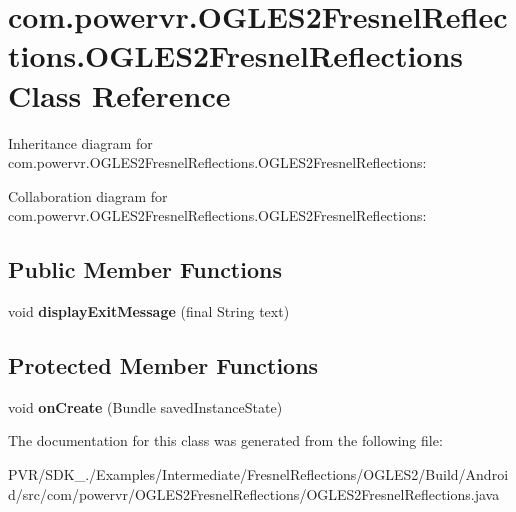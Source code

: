 \hypertarget{classcom_1_1powervr_1_1_o_g_l_e_s2_fresnel_reflections_1_1_o_g_l_e_s2_fresnel_reflections}{\section{com.\+powervr.\+O\+G\+L\+E\+S2\+Fresnel\+Reflections.\+O\+G\+L\+E\+S2\+Fresnel\+Reflections Class Reference}
\label{classcom_1_1powervr_1_1_o_g_l_e_s2_fresnel_reflections_1_1_o_g_l_e_s2_fresnel_reflections}
}


Inheritance diagram for com.\+powervr.\+O\+G\+L\+E\+S2\+Fresnel\+Reflections.\+O\+G\+L\+E\+S2\+Fresnel\+Reflections\+:


Collaboration diagram for com.\+powervr.\+O\+G\+L\+E\+S2\+Fresnel\+Reflections.\+O\+G\+L\+E\+S2\+Fresnel\+Reflections\+:
\subsection*{Public Member Functions}
\begin{DoxyCompactItemize}
\item 
\hypertarget{classcom_1_1powervr_1_1_o_g_l_e_s2_fresnel_reflections_1_1_o_g_l_e_s2_fresnel_reflections_a46b8befbe002f8732591d287bd32f2f6}{void {\bfseries display\+Exit\+Message} (final String text)}\label{classcom_1_1powervr_1_1_o_g_l_e_s2_fresnel_reflections_1_1_o_g_l_e_s2_fresnel_reflections_a46b8befbe002f8732591d287bd32f2f6}

\end{DoxyCompactItemize}
\subsection*{Protected Member Functions}
\begin{DoxyCompactItemize}
\item 
\hypertarget{classcom_1_1powervr_1_1_o_g_l_e_s2_fresnel_reflections_1_1_o_g_l_e_s2_fresnel_reflections_a22d1727378de362b382200a2e274b8fb}{void {\bfseries on\+Create} (Bundle saved\+Instance\+State)}\label{classcom_1_1powervr_1_1_o_g_l_e_s2_fresnel_reflections_1_1_o_g_l_e_s2_fresnel_reflections_a22d1727378de362b382200a2e274b8fb}

\end{DoxyCompactItemize}


The documentation for this class was generated from the following file\+:\begin{DoxyCompactItemize}
\item 
P\+V\+R/\+S\+D\+K\+\_./\+Examples/\+Intermediate/\+Fresnel\+Reflections/\+O\+G\+L\+E\+S2/\+Build/\+Android/src/com/powervr/\+O\+G\+L\+E\+S2\+Fresnel\+Reflections/O\+G\+L\+E\+S2\+Fresnel\+Reflections.\+java\end{DoxyCompactItemize}
